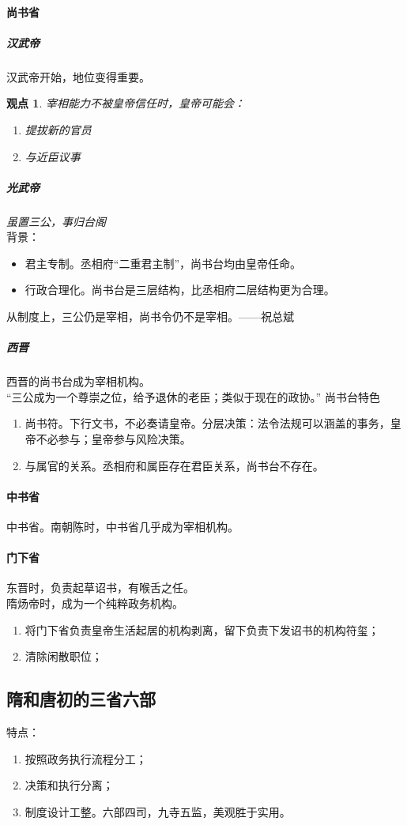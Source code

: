 \documentclass[twoside]{article}
\newtheorem{claim}[theorem]{观点}
\begin{document}
\paragraph{尚书省}
\subparagraph{汉武帝}
汉武帝开始，地位变得重要。\\
\begin{claim}
    宰相能力不被皇帝信任时，皇帝可能会：
    \begin{enumerate}
        \item 提拔新的官员
        \item 与近臣议事
    \end{enumerate}
\end{claim}
\subparagraph{光武帝}
\textit{虽置三公，事归台阁}\\
背景：
\begin{itemize}
    \item 君主专制。丞相府``二重君主制''，尚书台均由皇帝任命。
    \item 行政合理化。尚书台是三层结构，比丞相府二层结构更为合理。
\end{itemize}
从制度上，三公仍是宰相，尚书令仍不是宰相。——祝总斌
\subparagraph{西晋}
西晋的尚书台成为宰相机构。\\
``三公成为一个尊崇之位，给予退休的老臣；类似于现在的政协。''
尚书台特色
\begin{enumerate}
    \item 尚书符。下行文书，不必奏请皇帝。分层决策：法令法规可以涵盖的事务，皇帝不必参与；皇帝参与风险决策。
    \item 与属官的关系。丞相府和属臣存在君臣关系，尚书台不存在。
\end{enumerate}
\paragraph{中书省}
中书省。南朝陈时，中书省几乎成为宰相机构。
\paragraph{门下省}
东晋时，负责起草诏书，有喉舌之任。\\
隋炀帝时，成为一个纯粹政务机构。
\begin{enumerate}
    \item 将门下省负责皇帝生活起居的机构剥离，留下负责下发诏书的机构符玺；
    \item 清除闲散职位；
\end{enumerate}
\subsection{隋和唐初的三省六部}
特点：
\begin{enumerate}
    \item 按照政务执行流程分工；
    \item 决策和执行分离；
    \item 制度设计工整。六部四司，九寺五监，美观胜于实用。
\end{enumerate}
\end{document}
